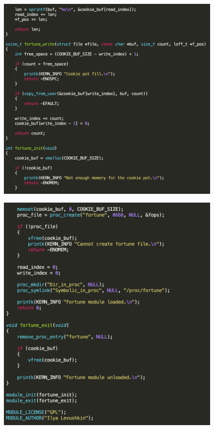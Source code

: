 \documentclass[a4paper,12pt]{article}
\begin{document}
	\begin{figure}[h!]
		\begin{center}
			{\includegraphics[scale = 0.7]{fortune2.png}}
			\label{ris:fortune2}
		\end{center}
	\end{figure}

	\newpage

	\begin{figure}[h!]
		\begin{center}
			{\includegraphics[scale = 0.7]{fortune3.png}}
			\label{ris:fortune3}
		\end{center}
	\end{figure}
	
\end{document}
